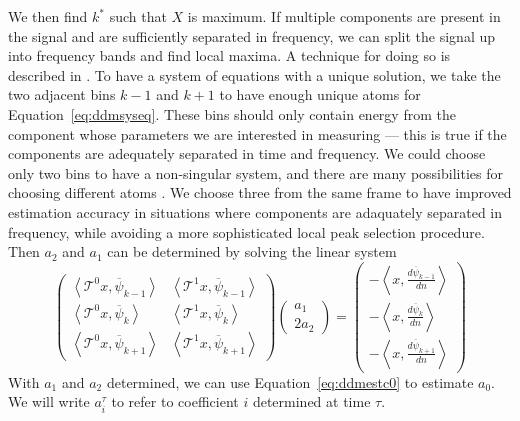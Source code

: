 We then find $k^{\ast}$ such that $X$ is maximum. If multiple components
are present in the signal and are sufficiently separated in frequency, we can
split the signal up into frequency bands and find local maxima. A technique for
doing so is described in \cite[p.~42]{serra1989system}. To have a system of
equations with a unique solution, we take the two adjacent bins $k-1$ and $k+1$
to have enough unique atoms for Equation~\ref{eq:ddmsyseq}. These bins should
only contain energy from the component whose parameters we are interested in
measuring --- this is true if the components are adequately separated in time
and frequency. We could choose only two bins to have a non-singular system, and
there are many possibilities for choosing different atoms
\cite[p.~4639]{betser2009sinusoidal}. We choose three from the same frame to
have improved estimation accuracy in situations where components are adaquately
separated in frequency, while avoiding a more sophisticated local peak selection
procedure. Then $a_2$ and $a_1$ can be determined by solving the linear system
\begin{equation}
    \begin{pmatrix}
        \left\langle \mathcal{T}^{0} x , \overline{\psi}_{k-1} \right\rangle &
        \left\langle \mathcal{T}^{1} x , \overline{\psi}_{k-1} \right\rangle \\
        \left\langle \mathcal{T}^{0} x , \overline{\psi}_{k} \right\rangle &
        \left\langle \mathcal{T}^{1} x , \overline{\psi}_{k} \right\rangle \\
        \left\langle \mathcal{T}^{0} x , \overline{\psi}_{k+1} \right\rangle & 
        \left\langle \mathcal{T}^{1} x , \overline{\psi}_{k+1} \right\rangle
    \end{pmatrix}
    \begin{pmatrix}
        a_{1} \\
        2a_{2}
    \end{pmatrix}
    =
    \begin{pmatrix}
        -\left\langle  x , \frac{d\overline{\psi}_{k-1}}{dn} \right\rangle \\
        -\left\langle  x , \frac{d\overline{\psi}_{k}}{dn} \right\rangle \\
        -\left\langle  x , \frac{d\overline{\psi}_{k+1}}{dn} \right\rangle
    \end{pmatrix}
\end{equation}
With $a_{1}$ and $a_{2}$ determined, we can use Equation~\ref{eq:ddmestc0} to
estimate $a_0$. We will write $a^{\tau}_{i}$ to refer to coefficient $i$
determined at time $\tau$.

